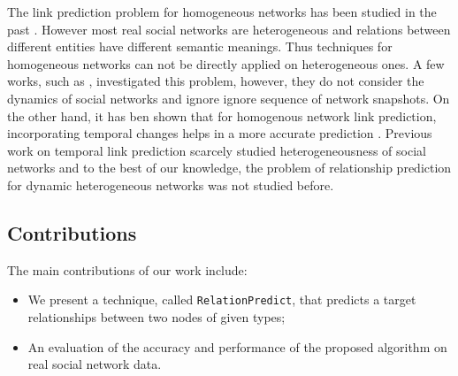 The link prediction problem for homogeneous networks has been studied in the past \cite{liben2007link}. However most real social networks are heterogeneous and relations between different entities have different semantic meanings. Thus techniques for homogeneous networks can not be directly applied on heterogeneous ones. A few works, such as \cite{sun2011pathsim,sun2011ASONAM}, investigated this problem, however, they do not consider the dynamics of social networks and ignore ignore sequence of network snapshots. On the other hand, it has ben shown that for homogenous network link prediction, incorporating temporal changes helps in a more accurate prediction \cite{Zhu2016}. Previous work on temporal link prediction scarcely studied heterogeneousness of social networks and to the best of our knowledge, the problem of relationship prediction for dynamic heterogeneous networks was not studied before.


\subsection{Contributions}

The main contributions of our work include:

\begin{itemize}

\item We present a technique, called \texttt{RelationPredict}, that predicts a target relationships between two nodes of given types;

\item An evaluation of the accuracy and performance of the proposed algorithm on real social network data.

\end{itemize}


